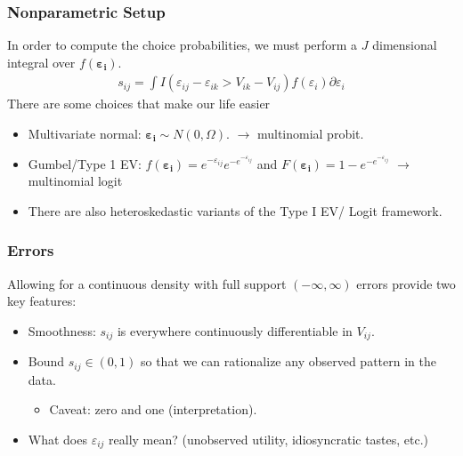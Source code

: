 \documentclass[aspectratio=169,11pt]{beamer}
\begin{document}
\begin{frame}
\frametitle{Nonparametric Setup}
In order to compute the choice probabilities, we must perform a $J$ dimensional integral over $f(\boldsymbol{\varepsilon_i})$.
\begin{align*}
s_{ij} =  \int I( \varepsilon_{ij}-\varepsilon_{ik} > V_{ik} - V_{ij} ) f( \varepsilon_i) \partial \varepsilon_i
\end{align*}
There are some choices that make our life easier
\begin{itemize}
\item Multivariate normal: $\boldsymbol{\varepsilon_i} \sim N(0,\Omega)$. $\longrightarrow$ \alert{ multinomial probit}.
\item Gumbel/Type 1 EV: $f(\boldsymbol{\varepsilon_i}) = e^{-\varepsilon_{ij}}  e^{-e^{-\varepsilon_{ij}}}  $ and $F(\boldsymbol{\varepsilon_i}) = 1- e^{-e^{-\varepsilon_{ij}}}$ $\longrightarrow$ \alert{multinomial logit}
\item There are also heteroskedastic variants of the Type I EV/ Logit framework.
\end{itemize}
\end{frame}

\begin{frame}
\frametitle{Errors}
Allowing for a continuous density with full support $(-\infty, \infty)$ errors provide two key features:
\begin{itemize}
\item Smoothness: $s_{ij}$ is everywhere continuously differentiable in $V_{ij}$.
\item Bound $s_{ij} \in (0,1)$ so that we can rationalize any observed pattern in the data.
\begin{itemize}
\item Caveat: zero and one (interpretation).
\end{itemize}
\item What does $\varepsilon_{ij}$ really mean? (unobserved utility, idiosyncratic tastes, etc.)
\end{itemize}
\end{frame}
\end{document}
